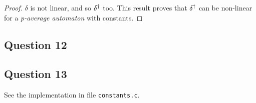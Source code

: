 \begin{proof}
 $\delta$ is not linear, and so $\delta^{\dag}$ too. This result proves that $\delta^{\dag}$ can be non-linear for a \textit{p-average automaton} with constants.
 \end{proof}


\subsection*{Question 12}


\subsection*{Question 13}
 
See the implementation in file \texttt{constants.c}.



